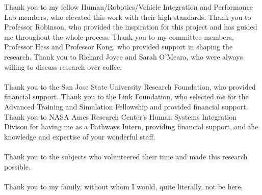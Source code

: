 \begin{frontmatter}
  \maketitle


  \tableofcontents
  \listoffigures
  \listoftables

  \newpage
  \begin{inlineabstract}
    \myabstract
  \end{inlineabstract}

  \begin{acknowledgments}
    Thank you to my fellow Human/Robotics/Vehicle Integration and Performance Lab members, who elevated this work with their high standards.
    Thank you to Professor Robinson, who provided the inspiration for this project and has guided me throughout the whole process.
    Thank you to my committee members, Professor Hess and Professor Kong, who provided support in shaping the research.
    Thank you to Richard Joyce and Sarah O'Meara, who were always willing to discuss research over coffee.\\
    \\
    Thank you to the San Jose State University Research Foundation, who provided financial support.
    Thank you to the Link Foundation, who selected me for the Advanced Training and Simulation Fellowship and provided financial support.
    Thank you to NASA Ames Research Center's Human Systems Integration Divison for having me as a Pathways Intern, providing financial support, and the knowledge and expertise of your wonderful staff.\\
    \\
    Thank you to the subjects who volunteered their time and made this research possible.\\
    \\
    Thank you to my family, without whom I would, quite literally, not be here.
  \end{acknowledgments}

\end{frontmatter}
